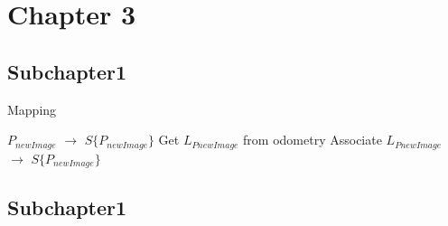\section{Chapter 3}
\label{sec:chap3}

\subsection{Subchapter1}
\label{sec:chap3sec1}

\begin{algorithm}[H]
\caption{Mapping}
\begin{algorithmic}[1]
\label{algo:mapping}
\item[]
\STATE $P_{newImage}$ $\rightarrow$ $S\{P_{newImage}\}$
\STATE Get $L_{PnewImage}$ from odometry
\STATE Associate $L_{PnewImage}$ $\rightarrow$ $S\{P_{newImage}\}$
\ENDWHILE
\end{algorithmic}
\end{algorithm}

\subsection{Subchapter1}
\label{sec:chap3sec2}
